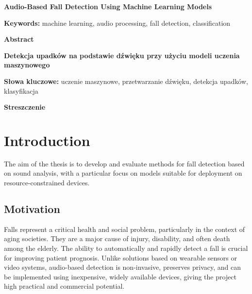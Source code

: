 \documentclass[11pt, a4paper, twoside]{article}
\newenvironment{abstractspec}{%
    \clearpage
    \thispagestyle{plain}
    \begin{singlespace}
    \fontsize{12}{14}\selectfont
    \noindent
}{%
    \end{singlespace}
    \clearpage
}
\begin{document}


\setcounter{page}{2} 
\begin{abstractspec}
    \begin{center}
        \textbf{Audio-Based Fall Detection Using Machine Learning Models}
    \end{center}
    \vspace{1em}
    \textbf{Keywords:} machine learning, audio processing, fall detection, classification
    \vspace{1em}
    
    \textbf{Abstract}\\
\end{abstractspec}

\begin{abstractspec}
    \begin{center}
        \textbf{Detekcja upadków na podstawie dźwięku przy użyciu modeli uczenia maszynowego}
    \end{center}
    \vspace{1em}
    \textbf{Słowa kluczowe:} uczenie maszynowe, przetwarzanie dźwięku, detekcja upadków, klasyfikacja
    \vspace{1em}
    
    \textbf{Streszczenie}\\
\end{abstractspec}

\normalsize

\tableofcontents
\newpage


\section{Introduction}

The aim of the thesis is to develop and evaluate methods for fall detection based on sound analysis, with a particular focus on models suitable for deployment on resource-constrained devices.

\subsection{Motivation}
Falls represent a critical health and social problem, particularly in the context of aging societies. They are a major cause of injury, disability, and often death among the elderly. The ability to automatically and rapidly detect a fall is crucial for improving patient prognosis. Unlike solutions based on wearable sensors or video systems, audio-based detection is non-invasive, preserves privacy, and can be implemented using inexpensive, widely available devices, giving the project high practical and commercial potential.
\end{document}
